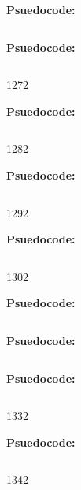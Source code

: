 
\textbf{Psuedocode:}
\begin{verbatim}
\end{verbatim}



\textbf{Psuedocode:}
\begin{verbatim}
\end{verbatim}


   {127}{2}

\textbf{Psuedocode:}
\begin{verbatim}
\end{verbatim}


  {128}{2}

\textbf{Psuedocode:}
\begin{verbatim}
\end{verbatim}


   {129}{2}

\textbf{Psuedocode:}
\begin{verbatim}
\end{verbatim}


  {130}{2}

\textbf{Psuedocode:}
\begin{verbatim}
\end{verbatim}



\textbf{Psuedocode:}
\begin{verbatim}
\end{verbatim}



\textbf{Psuedocode:}
\begin{verbatim}
\end{verbatim}


  {133}{2}

\textbf{Psuedocode:}
\begin{verbatim}
\end{verbatim}


  {134}{2}

